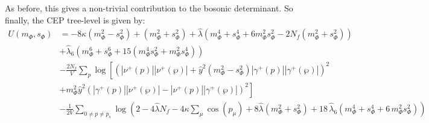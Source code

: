 As before, this gives a non-trivial contribution to the bosonic determinant. So finally, the CEP tree-level is given by:
\begin{align}\label{eq:improved_zeroOrderPot_withPhi6}
 U(m_{\Phi}, s_{\Phi}) &= -8 \kappa \left( m_{\Phi}^2 - s_{\Phi}^2 \right)   +   \left( m_{\Phi}^2 + s_{\Phi}^2 \right)
                         + \hat\lambda \left( m_{\Phi}^4 + s_{\Phi}^4 + 6 m_{\Phi}^2 s_{\Phi}^2 - 2 N_f \left(m_{\Phi}^2 + s_{\Phi}^2 \right) \right) 
         \nonumber \\
                        & + \hat\lambda_6 \left( m_{\Phi}^6 + s_{\Phi}^6 + 15 \left( m_{\Phi}^4 s_{\Phi}^2 + m_{\Phi}^2 s_{\Phi}^4 \right)   \right)
         \nonumber \\
                        & -\frac{2N_f}{V} \sum\limits_p \log
                                    \left[ \left( |\nu^+(p)| |\nu^+(\wp)|   +
                                    \hat y ^2 \left( m_{\Phi}^2 - s_{\Phi}^2 \right) |\gamma^+(p)| |\gamma^+(\wp)|\right)^2 
         \nonumber \right. \\
                        & \left. +  m_{\Phi}^2 \hat y^2 \left( |\gamma^+(p)| |\nu^+(\wp)|   -   |\nu^+(p)| |\gamma^+(\wp)| \right)^2\right]
         \nonumber \\
                        & - \frac{1}{2V}\sum\limits_{0 \neq p \neq p_s} 
          \log\left( 2 - 4 \hat\lambda N_f - 4 \kappa \sum_{\mu} \cos(p_{\mu}) + 8 \hat\lambda \left( m_{\Phi}^2 + s_{\Phi}^2  \right) 
                     +  18\, \hat\lambda_6\left( m_{\Phi}^4 + s_{\Phi}^4 + 6\, m_{\Phi}^2 s_{\Phi}^2 \right) \right)
\end{align}


